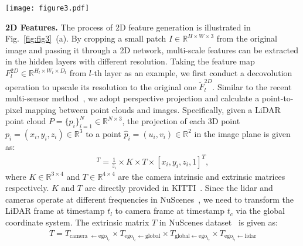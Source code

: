 \documentclass[runningheads]{llncs}
\begin{document}
	
	\begin{figure*}[t]
		\begin{centering}
			\texttt{[image: figure3.pdf]}
			\caption{\textbf{2D and 3D feature generation.} 
Part (a) demonstrates the 2D feature generation, where the point cloud will first be projected onto the image patch and generate the point-to-pixel (P2P) mapping.
After that, it transfers the 2D feature map to the point-wise 2D features according to P2P mapping.
Part (b) shows the 3D feature generation.
The point-to-voxel (P2V) mapping is easy to obtain, and the voxel features will be interpolated onto the point cloud.
			}
			\label{fig:fig3}
		\end{centering}	
	\end{figure*}
	
	
	\noindent\textbf{2D Features.}
The process of 2D feature generation is illustrated in Fig.~\ref{fig:fig3}~(a).
By cropping a small patch $I \in \mathbb{R}^{H\times W\times 3}$ from the original image and passing it through a 2D network, multi-scale features can be extracted in the hidden layers with different resolution.
Taking the feature map $F^{2D}_l \in \mathbb{R}^{H_l\times W_l\times D_l} $ from $l$-th layer as an example, we first conduct a decovolution operation to upscale its resolution to the original one $\tilde{F}^{2D}_l$.
Similar to the recent multi-sensor method~\cite{zhuang2021perception}, we adopt perspective projection and calculate a point-to-pixel mapping between point clouds and images.
Specifically, given a LiDAR point cloud $P = \{p_i\}_{i=1}^N \in \mathbb{R}^{N\times 3}$, the projection of each 3D point $p_i = (x_i, y_i, z_i) \in \mathbb{R}^{3}$ to a point $\hat{p}_i =(u_i, v_i) \in \mathbb{R}^{2}$ in the image plane is given as:
	\begin{align}
	[u_i, v_i, 1]^T = \frac{1}{z_i} \times K\times T \times [x_i, y_i, z_i, 1]^T,
	\label{project}
	\end{align}
	where $K \in \mathbb{R}^{3\times 4}$ and $T \in \mathbb{R}^{4\times 4}$ are the camera intrinsic and extrinsic matrices respectively.
$K$ and $T$ are directly provided in KITTI~\cite{geiger2012cvpr}.
Since the lidar and cameras operate at different frequencies in NuScenes~\cite{nuscenes}, we need to transform the LiDAR frame at timestamp $t_l$ to camera frame at timestamp $t_c$ via the global coordinate system.
	The extrinsic matrix $T$ in NuScenes dataset~\cite{nuscenes} is given as:
	\begin{align}
	T=T_{\text {camera } \leftarrow \mathrm{ego}_{\mathrm{t}_{c}}} \times 
	T_{\mathrm{ego}_{\mathrm{t}_{\mathrm{c}}} \leftarrow \mathrm{global}}\times 
	T_{\mathrm{global} \leftarrow \mathrm{ego}_{\mathrm{t}_{l}}}\times 
	T_{\mathrm{ego}_{\mathrm{t}_{l}} \leftarrow \mathrm{lidar}}
	\label{nuscene_trans}
	\end{align}
\end{document}
